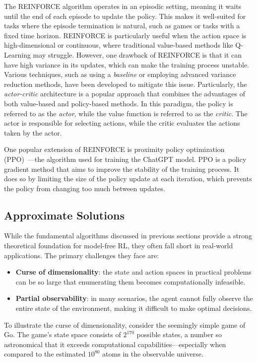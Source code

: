 The REINFORCE algorithm operates in an episodic setting, 
 meaning it waits until the end of each episode to update the policy. 
 This makes it well-suited for tasks where the episode termination is natural, 
 such as games or tasks with a fixed time horizon.
%
REINFORCE is particularly useful when the action space is high-dimensional or continuous, 
 where traditional value-based methods like Q-Learning may struggle.  
 However, one drawback of REINFORCE is that it can have high variance in its updates, 
 which can make the training process unstable. 
%
Various techniques, such as using a \emph{baseline} 
 or employing advanced variance reduction methods, have been developed to mitigate this issue.
 Particularly, the \emph{actor-critic} architecture is a popular approach that combines the advantages of both value-based and policy-based methods.
 In this paradigm, the policy is referred to as the \emph{actor}, while the value function is referred to as the \emph{critic}.
The actor is responsible for selecting actions, while the critic evaluates the actions taken by the actor.

One popular extension of REINFORCE is proximity policy optimization (PPO)~\cite{ppo}---the algorithm used for training the ChatGPT model. 
 PPO is a policy gradient method that aims to improve the stability of the training process. 
 It does so by limiting the size of the policy update at each iteration, 
 which prevents the policy from changing too much between updates. 
\subsection{Approximate Solutions}

While the fundamental algorithms discussed in previous sections provide a strong theoretical foundation for model-free RL, 
 they often fall short in real-world applications. 
 The primary challenges they face are:

\begin{itemize}
  \item \textbf{Curse of dimensionality}: the state and action spaces in practical problems can be so large that enumerating them becomes computationally infeasible.
  \item \textbf{Partial observability}: in many scenarios, the agent cannot fully observe the entire state of the environment, 
  making it difficult to make optimal decisions.
\end{itemize}
To illustrate the curse of dimensionality, 
 consider the seemingly simple game of Go. 
 The game's state space consists of \(2^{170}\) possible states, 
 a number so astronomical that it exceeds computational capabilities—especially when compared to the estimated \(10^{80}\) atoms in the observable universe.

